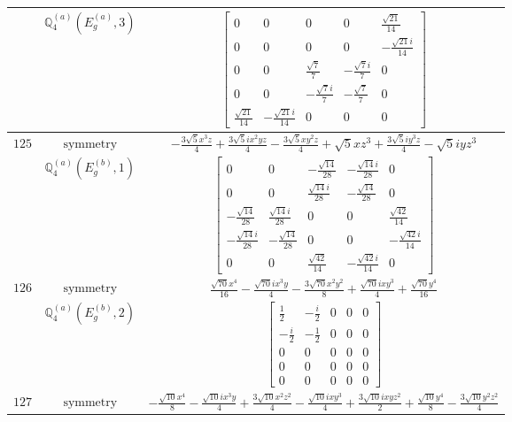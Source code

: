 \documentclass[fleqn,8pt,landscape]{jsarticle}
\begin{document}
\begin{longtable}{ccc}
$  $ & $ \mathbb{Q}_{4}^{(a)}(E_{g}^{(a)},3) $ & $ \begin{bmatrix} 0 & 0 & 0 & 0 & \frac{\sqrt{21}}{14} \\ 0 & 0 & 0 & 0 & - \frac{\sqrt{21} i}{14} \\ 0 & 0 & \frac{\sqrt{7}}{7} & - \frac{\sqrt{7} i}{7} & 0 \\ 0 & 0 & - \frac{\sqrt{7} i}{7} & - \frac{\sqrt{7}}{7} & 0 \\ \frac{\sqrt{21}}{14} & - \frac{\sqrt{21} i}{14} & 0 & 0 & 0 \end{bmatrix} $ \\ \hline
$ 125 $ & $ \text{symmetry} $ & $ - \frac{3 \sqrt{5} x^{3} z}{4} + \frac{3 \sqrt{5} i x^{2} y z}{4} - \frac{3 \sqrt{5} x y^{2} z}{4} + \sqrt{5} x z^{3} + \frac{3 \sqrt{5} i y^{3} z}{4} - \sqrt{5} i y z^{3} $ \\
$  $ & $ \mathbb{Q}_{4}^{(a)}(E_{g}^{(b)},1) $ & $ \begin{bmatrix} 0 & 0 & - \frac{\sqrt{14}}{28} & - \frac{\sqrt{14} i}{28} & 0 \\ 0 & 0 & \frac{\sqrt{14} i}{28} & - \frac{\sqrt{14}}{28} & 0 \\ - \frac{\sqrt{14}}{28} & \frac{\sqrt{14} i}{28} & 0 & 0 & \frac{\sqrt{42}}{14} \\ - \frac{\sqrt{14} i}{28} & - \frac{\sqrt{14}}{28} & 0 & 0 & - \frac{\sqrt{42} i}{14} \\ 0 & 0 & \frac{\sqrt{42}}{14} & - \frac{\sqrt{42} i}{14} & 0 \end{bmatrix} $ \\ \hline
$ 126 $ & $ \text{symmetry} $ & $ \frac{\sqrt{70} x^{4}}{16} - \frac{\sqrt{70} i x^{3} y}{4} - \frac{3 \sqrt{70} x^{2} y^{2}}{8} + \frac{\sqrt{70} i x y^{3}}{4} + \frac{\sqrt{70} y^{4}}{16} $ \\
$  $ & $ \mathbb{Q}_{4}^{(a)}(E_{g}^{(b)},2) $ & $ \begin{bmatrix} \frac{1}{2} & - \frac{i}{2} & 0 & 0 & 0 \\ - \frac{i}{2} & - \frac{1}{2} & 0 & 0 & 0 \\ 0 & 0 & 0 & 0 & 0 \\ 0 & 0 & 0 & 0 & 0 \\ 0 & 0 & 0 & 0 & 0 \end{bmatrix} $ \\ \hline
$ 127 $ & $ \text{symmetry} $ & $ - \frac{\sqrt{10} x^{4}}{8} - \frac{\sqrt{10} i x^{3} y}{4} + \frac{3 \sqrt{10} x^{2} z^{2}}{4} - \frac{\sqrt{10} i x y^{3}}{4} + \frac{3 \sqrt{10} i x y z^{2}}{2} + \frac{\sqrt{10} y^{4}}{8} - \frac{3 \sqrt{10} y^{2} z^{2}}{4} $ \\

\end{longtable}
\end{document}
